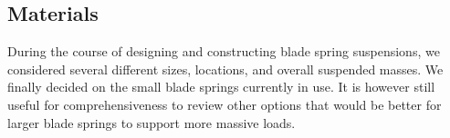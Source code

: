 % 
% 
% 



 
%
%
\subsection{Materials}
During the course of designing and constructing blade spring suspensions, we considered several different sizes, locations, and overall suspended masses. We finally decided on the small blade springs currently in use. It is however still useful for comprehensiveness to review other options that would be better for larger blade springs to support more massive loads.

